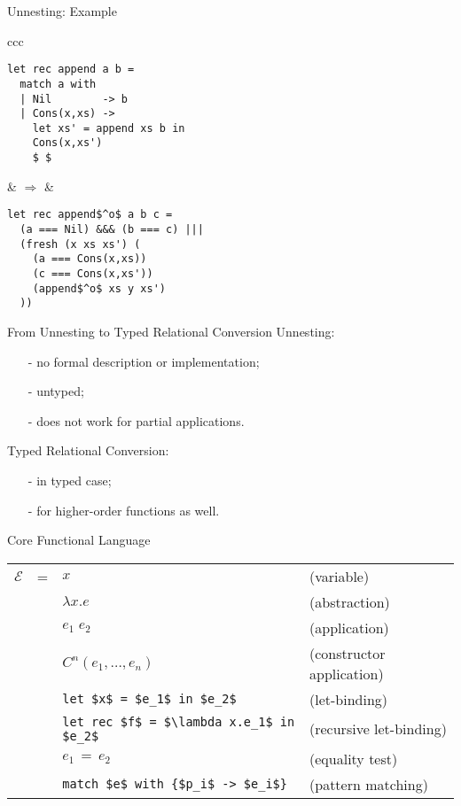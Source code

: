 \documentclass{beamer}
\let\\\tabularnewline
\let\\\tabularnewline
\theoremstyle{definition}
\begin{document}
\begin{frame}[fragile]{Unnesting: Example}
  \begin{tabular}{ccc}
    \begin{lstlisting}
let rec append a b =
  match a with
  | Nil        -> b
  | Cons(x,xs) -> 
    let xs' = append xs b in
    Cons(x,xs')       
    $ $
    \end{lstlisting} &
    $\Rightarrow$ &
    \begin{lstlisting}
let rec append$^o$ a b c =
  (a === Nil) &&& (b === c) |||
  (fresh (x xs xs') (
    (a === Cons(x,xs))
    (c === Cons(x,xs'))
    (append$^o$ xs y xs')
  ))
    \end{lstlisting}
  \end{tabular}
\end{frame}

\begin{frame}[fragile]{From Unnesting to Typed Relational Conversion}
Unnesting:
\begin{itemize}
    \item[-] no formal description or implementation;
    \item[-] untyped;
    \item[-] does not work for partial applications.
\end{itemize}
\vskip5mm
\pause
Typed Relational Conversion:
\begin{itemize}
    \item[-] in typed case;
    \item[-] for higher-order functions as well.
\end{itemize}
\end{frame}

\begin{frame}[fragile]{Core Functional Language}
\begin{tabular}{rcll}
  $\mathcal E$ &=&$x$                                                               &(variable)\\
               & &$\lambda x.e$                                                     &(abstraction)\\
               & &$e_1\;e_2$                                                        &(application)\\ 
               & &$C^n(e_1,\dots, e_n)$                                             &(constructor application)\\
               & &\lstinline|let $x$ = $e_1$ in $e_2$|                              &(let-binding)\\
               & &\lstinline|let rec $f$ = $\lambda x.e_1$ in $e_2$|                &(recursive let-binding)\\
               & &$e_1\,=\,e_2$                                                     &(equality test)\\
               & &\lstinline|match $e$ with {$p_i$ -> $e_i$}|                     &(pattern matching)
\end{tabular}

\end{frame}
\end{document}
